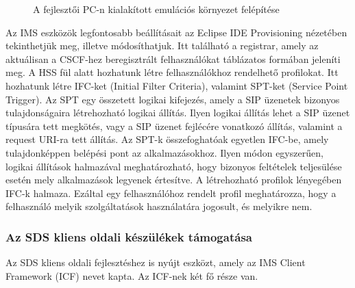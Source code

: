 \begin{figure}[htbp]
\center
{}
\caption{A fejlesztői PC-n kialakított emulációs környezet felépítése~\cite{sds_tech_desc}}
\label{fig:sds_env}
\end{figure}

Az IMS eszközök legfontosabb beállításait az Eclipse IDE Provisioning nézetében tekinthetjük meg, illetve módosíthatjuk. Itt található a registrar, amely az aktuálisan a CSCF-hez beregisztrált felhasználókat táblázatos formában jeleníti meg. A HSS fül alatt hozhatunk létre felhasználókhoz rendelhető profilokat. Itt hozhatunk létre IFC-ket (Initial Filter Criteria), valamint SPT-ket (Service Point Trigger). Az SPT egy összetett logikai kifejezés, amely a SIP üzenetek bizonyos tulajdonságaira létrehozható logikai állítás. Ilyen logikai állítás lehet a SIP üzenet típusára tett megkötés, vagy a SIP üzenet fejlécére vonatkozó állítás, valamint a request URI-ra tett állítás. Az SPT-k összefoghatóak egyetlen IFC-be, amely tulajdonképpen belépési pont az alkalmazásokhoz. Ilyen módon egyszerűen, logikai állítások halmazával meghatározható, hogy bizonyos feltételek teljesülése esetén mely alkalmazások legyenek értesítve. A létrehozható profilok lényegében IFC-k halmaza. Ezáltal egy felhasználóhoz rendelt profil meghatározza, hogy a felhasználó melyik szolgáltatások használatára jogosult, és melyikre nem. 

\subsubsection{Az SDS kliens oldali készülékek támogatása}

Az SDS kliens oldali fejlesztéshez is nyújt eszközt, amely az IMS Client Framework (ICF) nevet kapta. Az ICF-nek két fő része van. 

